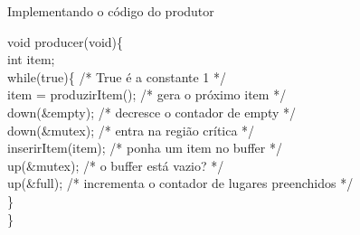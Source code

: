 \documentclass[11pt]{beamer}
\begin{document}
\begin{frame}{ Implementando o código do produtor}

 \begin{algorithm}[H]    
    void producer(void)\{ \\
\hspace{0,2 cm}      int item;\\
\vspace{0,3 cm}      
\hspace{0,2 cm}      while(true)\{		/* True é a constante 1 */\\
\hspace{0,5 cm}	item = produzirItem(); 	/* gera o próximo item */\\ 
\hspace{0,5 cm}	down(\&empty);		/* decresce o contador de empty */\\
\hspace{0,5 cm}	down(\&mutex);		/* entra na região crítica */\\
\hspace{0,5 cm}	inserirItem(item);	/* ponha um item no buffer */\\
\hspace{0,5 cm}	up(\&mutex);	 	/* o buffer está vazio? */\\
\hspace{0,5 cm}	up(\&full);		/* incrementa o contador de lugares preenchidos */\\
\hspace{0,2 cm}      \}\\
    \}\\
 \end{algorithm}
\end{frame}


\end{document}
